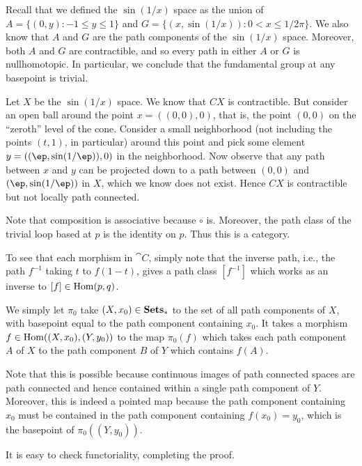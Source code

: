 \documentclass[../../solutions.tex]{subfiles}
\begin{document}
\begin{exercise} \leavevmode
Recall that we defined the $\sin(1/x)$ space as the union of $A=\{(0,y):-1\le y\le1\}$ and $G=\{(x,\sin(1/x)):0<x\le1/2\pi\}$. We also know that $A$ and $G$ are the path components of the $\sin(1/x)$ space. Moreover, both $A$ and $G$ are contractible, and so every path in either $A$ or $G$ is nullhomotopic. In particular, we conclude that the fundamental group at any basepoint is trivial.  
\end{exercise} 

\begin{exercise} \leavevmode 
Let $X$ be the $\sin(1/x)$ space. We know that $CX$ is contractible. But consider an open ball around the point $x=((0,0),0)$, that is, the point $(0,0)$ on the ``zeroth'' level of the cone. Consider a small neighborhood (not including the points $(t,1)$, in particular) around this point and pick some element $y=((\ep,\sin(1/\ep)),0)$ in the neighborhood. Now observe that any path between $x$ and $y$ can be projected down to a path between $(0,0)$ and $(\ep,\sin(1/\ep))$ in $X$, which we know does not exist. Hence $CX$ is contractible but not locally path connected. 
\end{exercise}

\begin{exercise} \leavevmode
Note that composition is associative because $\circ$ is. Moreover, the path class of the trivial loop based at $p$ is the identity on $p$. Thus this is a category. 

To see that each morphism in $\cat C$, simply note that the inverse path, i.e., the path $f^{-1}$ taking $t$ to $f(1-t)$, gives a path class $[f^{-1}]$ which works as an inverse to $[f]\in\operatorname{Hom}(p,q)$. 
\end{exercise}

\begin{exercise} \leavevmode 
We simply let $\pi_0$ take $(X,x_0)\in\textbf{Sets}_*$ to the set of all path components of $X$, with basepoint equal to the path component containing $x_0$. It takes a morphism $f\in\operatorname{Hom}((X,x_0),(Y,y_0))$ to the map $\pi_0(f)$ which takes each path component $A$ of $X$ to the path component $B$ of $Y$ which contains $f(A)$. 

Note that this is possible because continuous images of path connected spaces are path connected and hence contained within a single path component of $Y$. Moreover, this is indeed a pointed map because the path component containing $x_0$ must be contained in the path component containing $f(x_0)=y_0$, which is the basepoint of $\pi_0((Y,y_0))$. 

It is easy to check functoriality, completing the proof. 
\end{exercise}
\end{document}
